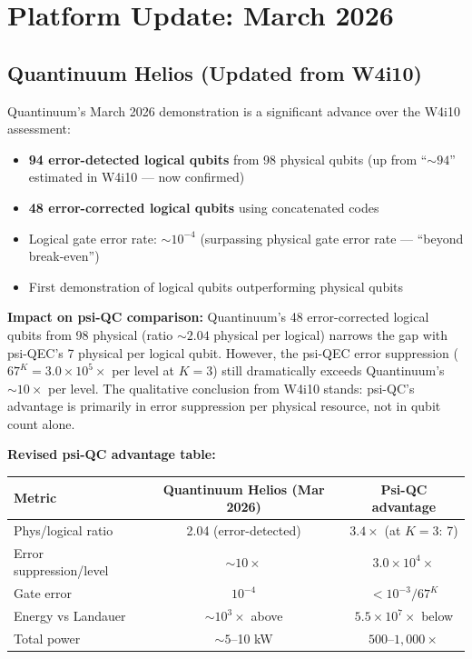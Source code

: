 \documentclass[11pt]{article}
\theoremstyle{definition}
\theoremstyle{remark}
\newcommand{\ee}[1]{\times 10^{#1}}
\begin{document}
\section{Platform Update: March 2026}
\label{sec:platform-update}

\subsection{Quantinuum Helios (Updated from W4i10)}
\label{sec:helios-update}

Quantinuum's March 2026 demonstration is a significant advance over the
W4i10 assessment:

\begin{itemize}[nosep]
\item \textbf{94 error-detected logical qubits} from 98 physical qubits
  (up from ``$\sim 94$'' estimated in W4i10 --- now confirmed)
\item \textbf{48 error-corrected logical qubits} using concatenated codes
\item Logical gate error rate: $\sim 10^{-4}$ (surpassing physical gate
  error rate --- ``beyond break-even'')
\item First demonstration of logical qubits outperforming physical qubits
\end{itemize}

\textbf{Impact on psi-QC comparison:} Quantinuum's 48 error-corrected
logical qubits from 98 physical (ratio $\sim 2.04$ physical per logical)
narrows the gap with psi-QEC's 7 physical per logical qubit. However, the
psi-QEC error suppression ($67^K = 3.0\ee{5}\times$ per level at $K=3$)
still dramatically exceeds Quantinuum's $\sim 10\times$ per level. The
qualitative conclusion from W4i10 stands: psi-QC's advantage is primarily
in error suppression per physical resource, not in qubit count alone.

\textbf{Revised psi-QC advantage table:}

\begin{center}
\begin{tabular}{@{}lcc@{}}
\toprule
Metric & Quantinuum Helios (Mar 2026) & Psi-QC advantage \\
\midrule
Phys/logical ratio & 2.04 (error-detected) & $3.4\times$ (at $K=3$: 7) \\
Error suppression/level & $\sim 10\times$ & $3.0\ee{4}\times$ \\
Gate error & $10^{-4}$ & $< 10^{-3}/67^K$ \\
Energy vs Landauer & $\sim 10^3\times$ above & $5.5\ee{7}\times$ below \\
Total power & $\sim 5$--10 kW & $500$--$1{,}000\times$ \\
\bottomrule
\end{tabular}
\end{center}
\end{document}
